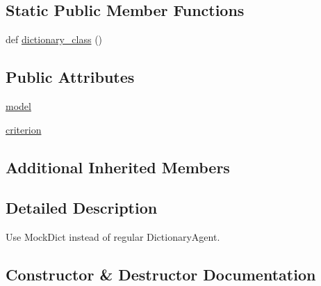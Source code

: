 \subsection*{Static Public Member Functions}
\begin{DoxyCompactItemize}
\item 
def \hyperlink{classparlai_1_1agents_1_1test__agents_1_1dummy__torch__agent_1_1MockTorchAgent_a122bde825e09b1450578a7ab7d606bfd}{dictionary\+\_\+class} ()
\end{DoxyCompactItemize}
\subsection*{Public Attributes}
\begin{DoxyCompactItemize}
\item 
\hyperlink{classparlai_1_1agents_1_1test__agents_1_1dummy__torch__agent_1_1MockTorchAgent_afebdb752bdbb212a078b4bdee5d9f45f}{model}
\item 
\hyperlink{classparlai_1_1agents_1_1test__agents_1_1dummy__torch__agent_1_1MockTorchAgent_a229d18c3a8eb8512c29feca34fed43b7}{criterion}
\end{DoxyCompactItemize}
\subsection*{Additional Inherited Members}


\subsection{Detailed Description}
\begin{DoxyVerb}Use MockDict instead of regular DictionaryAgent.
\end{DoxyVerb}
 

\subsection{Constructor \& Destructor Documentation}
\mbox{\label{classparlai_1_1agents_1_1test__agents_1_1dummy__torch__agent_1_1MockTorchAgent_af14024f59e4ea3dea5c7ff38caff89ad}} 
